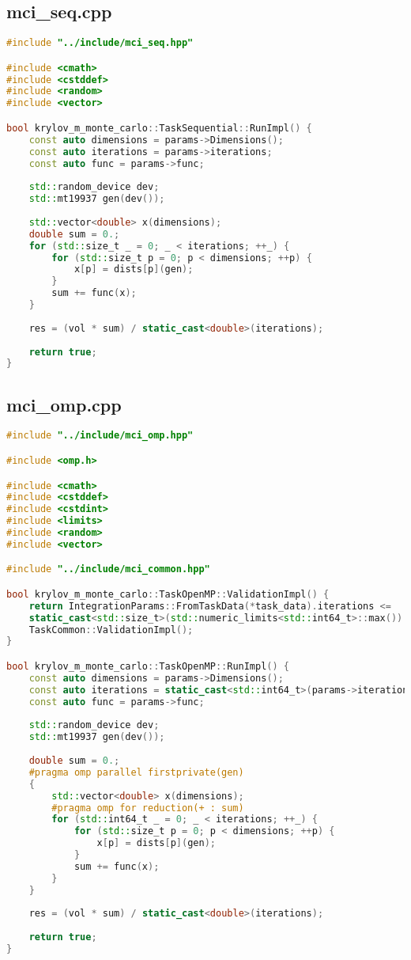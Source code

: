 \documentclass[a4paper,12pt]{article}
\begin{document}
\subsection{mci\_seq.cpp}
\begin{lstlisting}[language=C++]
#include "../include/mci_seq.hpp"

#include <cmath>
#include <cstddef>
#include <random>
#include <vector>

bool krylov_m_monte_carlo::TaskSequential::RunImpl() {
	const auto dimensions = params->Dimensions();
	const auto iterations = params->iterations;
	const auto func = params->func;
	
	std::random_device dev;
	std::mt19937 gen(dev());
	
	std::vector<double> x(dimensions);
	double sum = 0.;
	for (std::size_t _ = 0; _ < iterations; ++_) {
		for (std::size_t p = 0; p < dimensions; ++p) {
			x[p] = dists[p](gen);
		}
		sum += func(x);
	}
	
	res = (vol * sum) / static_cast<double>(iterations);
	
	return true;
}
\end{lstlisting}

\subsection{mci\_omp.cpp}
\begin{lstlisting}[language=C++]
#include "../include/mci_omp.hpp"

#include <omp.h>

#include <cmath>
#include <cstddef>
#include <cstdint>
#include <limits>
#include <random>
#include <vector>

#include "../include/mci_common.hpp"

bool krylov_m_monte_carlo::TaskOpenMP::ValidationImpl() {
	return IntegrationParams::FromTaskData(*task_data).iterations <=
	static_cast<std::size_t>(std::numeric_limits<std::int64_t>::max()) &&
	TaskCommon::ValidationImpl();
}

bool krylov_m_monte_carlo::TaskOpenMP::RunImpl() {
	const auto dimensions = params->Dimensions();
	const auto iterations = static_cast<std::int64_t>(params->iterations);
	const auto func = params->func;
	
	std::random_device dev;
	std::mt19937 gen(dev());
	
	double sum = 0.;
	#pragma omp parallel firstprivate(gen)
	{
		std::vector<double> x(dimensions);
		#pragma omp for reduction(+ : sum)
		for (std::int64_t _ = 0; _ < iterations; ++_) {
			for (std::size_t p = 0; p < dimensions; ++p) {
				x[p] = dists[p](gen);
			}
			sum += func(x);
		}
	}
	
	res = (vol * sum) / static_cast<double>(iterations);
	
	return true;
}
\end{lstlisting}
\end{document}

